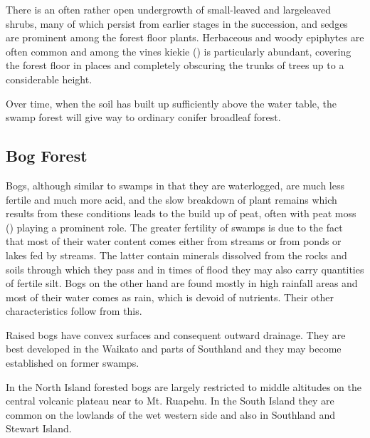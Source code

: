There is an often rather open undergrowth of small-leaved and largeleaved shrubs, many of which persist from earlier stages in the succession, and sedges are prominent among the forest floor plants.
Herbaceous and woody epiphytes are often common and among the vines kiekie () is particularly abundant, covering the forest floor in places and completely obscuring the trunks of trees up to a considerable height.

Over time, when the soil has built up sufficiently above the water table, the swamp forest will give way to ordinary conifer broadleaf forest.

\subsection{Bog Forest}

Bogs, although similar to swamps in that they are waterlogged, are much less fertile and much more acid, and the slow breakdown of plant remains which results from these conditions leads to the build up of peat, often with peat moss () playing a prominent role.
The greater fertility of swamps is due to the fact that most of their water content comes either from streams or from ponds or lakes fed by streams.
The latter contain minerals dissolved from the rocks and soils through which they pass and in times of flood they may also carry quantities of fertile silt.
Bogs on the other hand are found mostly in high rainfall areas and most of their water comes as rain, which is devoid of nutrients.
Their other characteristics follow from this.

Raised bogs have convex surfaces and consequent outward drainage.
They are best developed in the Waikato and parts of Southland and they may become established on former swamps.

In the North Island forested bogs are largely restricted to middle altitudes on the central volcanic plateau near to Mt. Ruapehu.
In the South Island they are common on the lowlands of the wet western side and also in Southland and Stewart Island.


